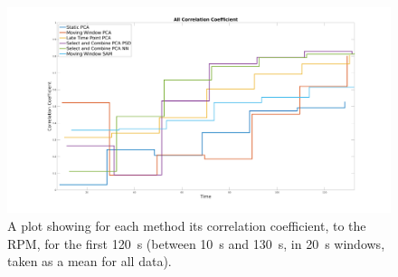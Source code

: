    \begin{figure}
        
        \centering
        
        \includegraphics[width=1.0\linewidth]{figures/all_correlation_coefficient.png}
        
        
        \captionsetup{singlelinecheck=false, justification=centering}
        \caption{
        A plot showing for each method its correlation coefficient, to the \gls{RPM}, for the first \SI{120}{\second} (between \SI{10}{\second} and \SI{130}{\second}, in \SI{20}{\second} windows, taken as a mean for all data).}
        
        \label{fig:all_cross_correlation}
        
    \end{figure}
    
